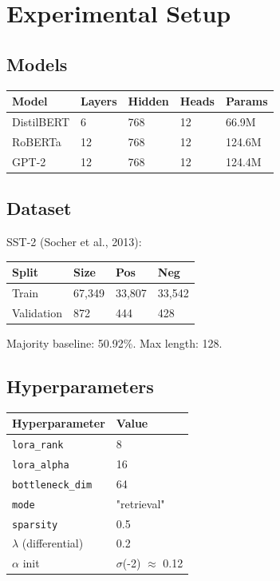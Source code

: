 \section{Experimental Setup}

\subsection{Models}

\begin{table}[H]
\centering
\small
\begin{tabular}{lllll}
\toprule
\textbf{Model} & \textbf{Layers} & \textbf{Hidden} & \textbf{Heads} & \textbf{Params} \\
\midrule
DistilBERT & 6 & 768 & 12 & 66.9M \\
RoBERTa & 12 & 768 & 12 & 124.6M \\
GPT-2 & 12 & 768 & 12 & 124.4M \\
\bottomrule
\end{tabular}
\end{table}

\subsection{Dataset}

SST-2 (Socher et al., 2013):

\begin{table}[H]
\centering
\small
\begin{tabular}{llll}
\toprule
\textbf{Split} & \textbf{Size} & \textbf{Pos} & \textbf{Neg} \\
\midrule
Train & 67,349 & 33,807 & 33,542 \\
Validation & 872 & 444 & 428 \\
\bottomrule
\end{tabular}
\end{table}

Majority baseline: 50.92\%. Max length: 128.

\subsection{Hyperparameters}

\begin{table}[H]
\centering
\small
\begin{tabular}{ll}
\toprule
\textbf{Hyperparameter} & \textbf{Value} \\
\midrule
\texttt{lora\_rank} & 8 \\
\texttt{lora\_alpha} & 16 \\
\texttt{bottleneck\_dim} & 64 \\
\texttt{mode} & "retrieval" \\
\texttt{sparsity} & 0.5 \\
$\lambda$ (differential) & 0.2 \\
$\alpha$ init & $\sigma$(-2) $\approx$ 0.12 \\
\bottomrule
\end{tabular}
\end{table}

